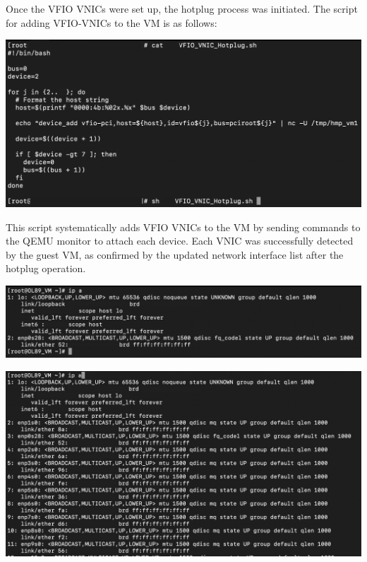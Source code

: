 Once the VFIO VNICs were set up, the hotplug process was initiated. The script for adding VFIO-VNICs to the VM is as follows:

\begin{center}
    \centering
    \includegraphics[width=\textwidth]{Images/24 VFIO VNIC Hotplug Script.png}
    \label{fig}
\end{center}

This script systematically adds VFIO VNICs to the VM by sending commands to the QEMU monitor to attach each device. Each VNIC was successfully detected by the guest VM, as confirmed by the updated network interface list after the hotplug operation.

\begin{center}
    \centering
    \includegraphics[width=\textwidth]{Images/ip a before hotplug vfio.png}
    \label{fig}
\end{center}

\begin{center}
    \centering
    \includegraphics[width=\textwidth]{Images/ip a after vfio.png}
    \label{fig}
\end{center}

